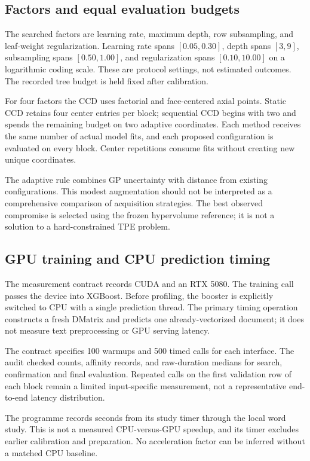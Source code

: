 \documentclass[12pt,a4paper]{article}
\begin{document}
\subsection{Factors and equal evaluation budgets}
The searched factors are learning rate, maximum depth, row subsampling, and leaf-weight regularization. Learning rate spans $[0.05,0.30]$, depth spans $[3,9]$, subsampling spans $[0.50,1.00]$, and regularization spans $[0.10,10.00]$ on a logarithmic coding scale. These are protocol settings, not estimated outcomes. The recorded tree budget is held fixed after calibration.

For four factors the CCD uses factorial and face-centered axial points. Static CCD retains four center entries per block; sequential CCD begins with two and spends the remaining budget on two adaptive coordinates. Each method receives the same number of actual model fits, and each proposed configuration is evaluated on every block. Center repetitions consume fits without creating new unique coordinates.

The adaptive rule combines GP uncertainty with distance from existing configurations. This modest augmentation should not be interpreted as a comprehensive comparison of acquisition strategies. The best observed compromise is selected using the frozen hypervolume reference; it is not a solution to a hard-constrained TPE problem.

\subsection{GPU training and CPU prediction timing}
The measurement contract records CUDA and an RTX 5080. The training call passes the device into XGBoost. Before profiling, the booster is explicitly switched to CPU with a single prediction thread. The primary timing operation constructs a fresh DMatrix and predicts one already-vectorized document; it does not measure text preprocessing or GPU serving latency.

The contract specifies 100 warmups and 500 timed calls for each interface. The audit checked counts, affinity records, and raw-duration medians for search, confirmation and final evaluation. Repeated calls on the first validation row of each block remain a limited input-specific measurement, not a representative end-to-end latency distribution.

The programme records \Elapsed{} seconds from its study timer through the local word study. This is not a measured CPU-versus-GPU speedup, and its timer excludes earlier calibration and preparation. No acceleration factor can be inferred without a matched CPU baseline.
\end{document}
